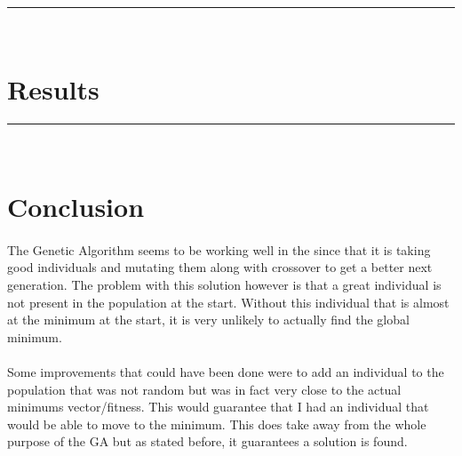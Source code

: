 \documentclass[paper=a4, fontsize=11pt]{scrartcl} %
\numberwithin{equation}{section} %
\numberwithin{figure}{section} %
\numberwithin{table}{section} %
\newcommand{\horrule}[1]{\rule{\linewidth}{#1}} %
\begin{document}
\paragraph{} 


\horrule{0.5pt} \\[0.4cm] %
\section{Results}





\horrule{0.5pt} \\[0.4cm] %
\section{Conclusion}

\paragraph{} The Genetic Algorithm seems to be working well in the since that it is taking good individuals and mutating them along with crossover to get a better next generation. The problem with this solution however is that a great individual is not present in the population at the start. Without this individual that is almost at the minimum at the start, it is very unlikely to actually find the global minimum.

\paragraph{} Some improvements that could have been done were to add an individual to the population that was not random but was in fact very close to the actual minimums vector/fitness. This would guarantee that I had an individual that would be able to move to the minimum. This does take away from the whole purpose of the GA but as stated before, it guarantees a solution is found.
\end{document}
